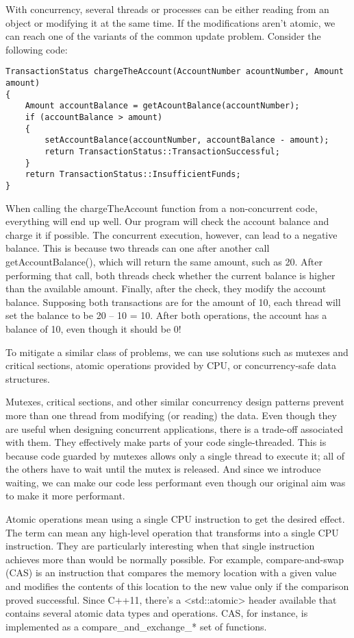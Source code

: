 With concurrency, several threads or processes can be either reading from an object or modifying it at the same time. If the modifications aren't atomic, we can reach one of the variants of the common update problem. Consider the following code:

\begin{lstlisting}[style=styleCXX]
TransactionStatus chargeTheAccount(AccountNumber acountNumber, Amount
amount)
{
	Amount accountBalance = getAcountBalance(accountNumber);
	if (accountBalance > amount)
	{
		setAccountBalance(accountNumber, accountBalance - amount);
		return TransactionStatus::TransactionSuccessful;
	}
	return TransactionStatus::InsufficientFunds;
}
\end{lstlisting}

When calling the chargeTheAccount function from a non-concurrent code, everything will end up well. Our program will check the account balance and charge it if possible. The concurrent execution, however, can lead to a negative balance. This is because two threads can one after another call getAccountBalance(), which will return the same amount, such as 20. After performing that call, both threads check whether the current balance is higher than the available amount. Finally, after the check, they modify the account balance. Supposing both transactions are for the amount of 10, each thread will set the balance to be 20 – 10 = 10. After both operations, the account has a balance of 10, even though it should be 0!

To mitigate a similar class of problems, we can use solutions such as mutexes and critical sections, atomic operations provided by CPU, or concurrency-safe data structures.

Mutexes, critical sections, and other similar concurrency design patterns prevent more than one thread from modifying (or reading) the data. Even though they are useful when designing concurrent applications, there is a trade-off associated with them. They effectively make parts of your code single-threaded. This is because code guarded by mutexes allows only a single thread to execute it; all of the others have to wait until the mutex is released. And since we introduce waiting, we can make our code less performant even though our original aim was to make it more performant.

Atomic operations mean using a single CPU instruction to get the desired effect. The term can mean any high-level operation that transforms into a single CPU instruction. They are particularly interesting when that single instruction achieves more than would be normally possible. For example, compare-and-swap (CAS) is an instruction that compares the memory location with a given value and modifies the contents of this location to the new value only if the comparison proved successful. Since C++11, there's a <std::atomic> header available that contains several atomic data types and operations. CAS, for instance, is implemented as a compare\_and\_exchange\_* set of functions.

